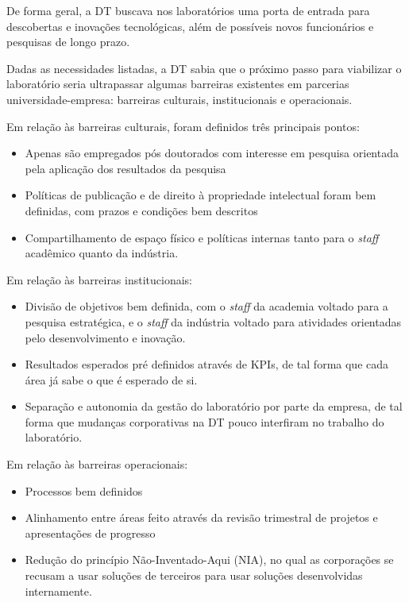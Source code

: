 De forma geral, a DT buscava nos laboratórios uma porta de entrada para descobertas e inovações tecnológicas, além de possíveis novos funcionários e pesquisas de longo prazo.

Dadas as necessidades listadas, a DT sabia que o próximo passo para viabilizar o laboratório seria ultrapassar algumas barreiras existentes em parcerias universidade-empresa: barreiras culturais, institucionais e operacionais. \cite{barriers}

Em relação às barreiras culturais, foram definidos três principais pontos:
\begin{itemize}
\item Apenas são empregados pós doutorados com interesse em pesquisa orientada pela aplicação dos resultados da pesquisa
\item Políticas de publicação e de direito à propriedade intelectual foram bem definidas, com prazos e condições bem descritos
\item Compartilhamento de espaço físico e políticas internas tanto para o \textit{staff} acadêmico quanto da indústria.
\end{itemize}

Em relação às barreiras institucionais:
\begin{itemize}
\item Divisão de objetivos bem definida, com o \textit{staff} da academia voltado para a pesquisa estratégica, e o \textit{staff} da indústria voltado para atividades orientadas pelo desenvolvimento e inovação.
\item Resultados esperados pré definidos através de KPIs, de tal forma que cada área já sabe o que é esperado de si.
\item Separação e autonomia da gestão do laboratório por parte da empresa, de tal forma que mudanças corporativas na DT pouco interfiram no trabalho do laboratório.
\end{itemize}

Em relação às barreiras operacionais:
\begin{itemize}
\item Processos bem definidos 
\item Alinhamento entre áreas feito através da revisão trimestral de projetos e apresentações de progresso
\item Redução do princípio Não-Inventado-Aqui (NIA), no qual as corporações se recusam a usar soluções de terceiros para usar soluções desenvolvidas internamente.
\end{itemize}

